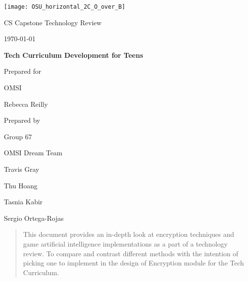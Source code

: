 \documentclass[onecolumn, draftclsnofoot,10pt, compsoc]{IEEEtran}
\def \CapstoneTeamName{		OMSI Dream Team}
\def \CapstoneTeamNumber{		67}
\def \GroupMemberOne{			Travis Gray}
\def \GroupMemberTwo{			Thu Hoang}
\def \GroupMemberThree{			Tasnia Kabir}
\def \GroupMemberFour{			Sergio Ortega-Rojas}
\def \CapstoneProjectName{		Tech Curriculum Development for Teens}
\def \CapstoneSponsorCompany{	OMSI}
\def \CapstoneSponsorPerson{		Rebecca Reilly}
\def \DocType{		%
				Technology Review
				}
\newcommand{\NameSigPair}[1]{\par
\makebox[2.75in][r]{#1} \hfil 	\makebox[3.25in]{\makebox[2.25in]{\hrulefill} \hfill		\makebox[.75in]{\hrulefill}}
\par\vspace{-12pt} \textit{\tiny\noindent
\makebox[2.75in]{} \hfil		\makebox[3.25in]{\makebox[2.25in][r]{Signature} \hfill	\makebox[.75in][r]{Date}}}}
\renewcommand{\NameSigPair}[1]{#1}
\begin{document}
\begin{titlepage}
    \begin{singlespace}
    	\texttt{[image: OSU\_horizontal\_2C\_O\_over\_B]}
        \hfill 
        \par\vspace{.2in}
        \centering
        \scshape{
            \huge CS Capstone \DocType \par
            {\large\today}\par
            \vspace{.5in}
            \textbf{\Huge\CapstoneProjectName}\par
            \vfill
            {\large Prepared for}\par
            \Huge \CapstoneSponsorCompany\par
            \vspace{5pt}
            {\Large\NameSigPair{\CapstoneSponsorPerson}\par}
            {\large Prepared by }\par
            Group\CapstoneTeamNumber\par
            \CapstoneTeamName\par 
            \vspace{5pt}
            {\Large
                \NameSigPair{\GroupMemberOne}\par
                \NameSigPair{\GroupMemberTwo}\par
                \NameSigPair{\GroupMemberThree}\par
                \NameSigPair{\GroupMemberFour}\par
            }
            \vspace{20pt}
        }
        \begin{abstract}
        	This document provides an in-depth look at encryption techniques and game artificial intelligence implementations as a part of a technology review. To compare and contrast different methods with the intention of picking one to implement in the design of Encryption module for the Tech Curriculum.
        \end{abstract}     
    \end{singlespace}
\end{titlepage}
\newpage
{}
\tableofcontents
\clearpage
\end{document}
